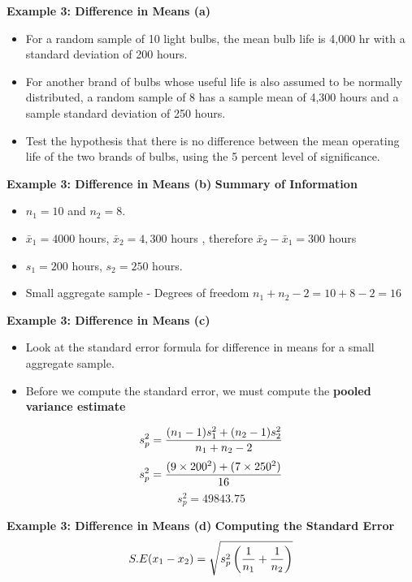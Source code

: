 \documentclass[a4]{beamer}
\begin{document}
\noindent \textbf{Example 3: Difference in Means (a) }
\vspace{-1cm}
\begin{itemize}
\item For a random sample of 10 light bulbs, the mean bulb life is 4,000 hr with a standard deviation of 200 hours.
\item For another brand of bulbs whose useful life is also assumed to be normally distributed, a random sample of 8 has a sample mean of 4,300 hours
and a sample standard deviation of 250 hours. \item Test the hypothesis that there is no difference between the
mean operating life of the two brands of bulbs, using the 5 percent level of significance.
\end{itemize}



\noindent \textbf{Example 3: Difference in Means (b) }
\textbf{Summary of Information}
\begin{itemize}\item $n_1 = 10$ and $n_2 = 8$.
\item $\bar{x}_1 = 4000$ hours, $\bar{x}_2 = 4,300 $ hours , therefore  $\bar{x}_2 - \bar{x}_1 = 300$ hours
\item $s_1  = 200$ hours, $s_2 = 250$ hours.
\item Small aggregate sample - Degrees of freedom $n_1 + n_2 - 2 = 10 + 8 - 2 = 16$
\end{itemize}

\noindent \textbf{Example 3: Difference in Means (c) }
\begin{itemize}
\item Look at the standard error formula for difference in means for a small aggregate sample.
\item Before we compute the standard error, we must compute the \textbf{pooled variance estimate}
\end{itemize}
\[ s^2_p = {(n_1 - 1)s^2_1  + (n_2 - 1)s^2_ 2\over n_1 + n_2 - 2 } \]\[s^2_p = {(9 \times 200^2 ) +( 7 \times 250^2) \over 16 }  \]
\[ s^2_p  = 49843.75 \]



\noindent \textbf{Example 3: Difference in Means (d) }
\textbf{Computing the Standard Error}
\[ S.E(x_1 - x_2) = \sqrt{s^2_p \left({1\over n_1}+{1\over n_2} \right)}\]
\end{document}
